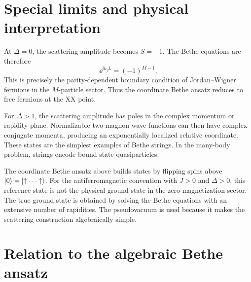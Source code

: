 \section{Special limits and physical interpretation}
\label{sec:cba-special-limits-interpretation}

\begin{example}[XX point]
At $\Delta=0$, the scattering amplitude becomes $S=-1$.  The Bethe equations are
therefore
\begin{equation}
    \ee^{\ii k_jL}=(-1)^{M-1} .
\end{equation}
This is precisely the parity-dependent boundary condition of Jordan--Wigner
fermions in the $M$-particle sector.  Thus the coordinate Bethe ansatz reduces to
free fermions at the XX point.
\end{example}

\begin{example}
For $\Delta>1$, the scattering amplitude has poles in the complex momentum or
rapidity plane.  Normalizable two-magnon wave functions can then have complex
conjugate momenta, producing an exponentially localized relative coordinate.
These states are the simplest examples of Bethe strings.  In the many-body
problem, strings encode bound-state quasiparticles.
\end{example}

\begin{remark}
The coordinate Bethe ansatz above builds states by flipping spins above
$\left|0\right\rangle=\left|\uparrow\cdots\uparrow\right\rangle$.  For the antiferromagnetic convention
with $J>0$ and $\Delta>0$, this reference state is not the physical ground state
in the zero-magnetization sector.  The true ground state is obtained by solving
the Bethe equations with an extensive number of rapidities.  The pseudovacuum is
used because it makes the scattering construction algebraically simple.
\end{remark}

\section{Relation to the algebraic Bethe ansatz}
\label{sec:cba-relation-to-aba}

